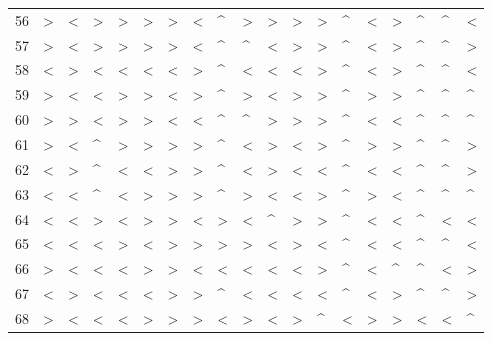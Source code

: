 \begin{tabular}{lllllllllllllllllll}
56  &  > &  < &  > &  > &  > &  > &  < &  \textasciicircum  &  > &  > &  > &  > &  \textasciicircum  &  < &  > &  \textasciicircum  &  \textasciicircum  &  < \\
57  &  > &  < &  > &  > &  > &  > &  < &  \textasciicircum  &  \textasciicircum  &  < &  > &  > &  \textasciicircum  &  < &  > &  \textasciicircum  &  \textasciicircum  &  > \\
58  &  < &  > &  < &  < &  < &  < &  > &  \textasciicircum  &  < &  < &  < &  > &  \textasciicircum  &  < &  > &  \textasciicircum  &  \textasciicircum  &  < \\
59  &  > &  < &  < &  > &  > &  < &  > &  \textasciicircum  &  > &  < &  > &  > &  \textasciicircum  &  > &  > &  \textasciicircum  &  \textasciicircum  &  \textasciicircum  \\
60  &  > &  > &  < &  > &  > &  < &  < &  \textasciicircum  &  \textasciicircum  &  > &  > &  > &  \textasciicircum  &  < &  < &  \textasciicircum  &  \textasciicircum  &  \textasciicircum  \\
61  &  > &  < &  \textasciicircum  &  > &  > &  > &  > &  \textasciicircum  &  < &  > &  < &  > &  \textasciicircum  &  > &  > &  \textasciicircum  &  \textasciicircum  &  > \\
62  &  < &  > &  \textasciicircum  &  < &  < &  > &  > &  \textasciicircum  &  < &  > &  < &  < &  \textasciicircum  &  < &  < &  \textasciicircum  &  \textasciicircum  &  > \\
63  &  < &  < &  \textasciicircum  &  < &  > &  > &  > &  \textasciicircum  &  > &  < &  < &  > &  \textasciicircum  &  > &  < &  \textasciicircum  &  \textasciicircum  &  \textasciicircum  \\
64  &  < &  < &  > &  < &  > &  > &  < &  > &  < &  \textasciicircum  &  > &  > &  \textasciicircum  &  < &  < &  \textasciicircum  &  < &  < \\
65  &  < &  < &  < &  > &  < &  > &  > &  > &  > &  < &  > &  < &  \textasciicircum  &  < &  < &  \textasciicircum  &  \textasciicircum  &  < \\
66  &  > &  < &  < &  < &  > &  > &  < &  < &  < &  < &  < &  > &  \textasciicircum  &  < &  \textasciicircum  &  \textasciicircum  &  < &  > \\
67  &  < &  > &  < &  < &  < &  > &  > &  \textasciicircum  &  < &  < &  < &  < &  \textasciicircum  &  < &  > &  \textasciicircum  &  \textasciicircum  &  > \\
68  &  > &  < &  < &  < &  > &  > &  > &  < &  > &  < &  > &  \textasciicircum  &  < &  > &  > &  < &  < &  \textasciicircum  \\

\end{tabular}
